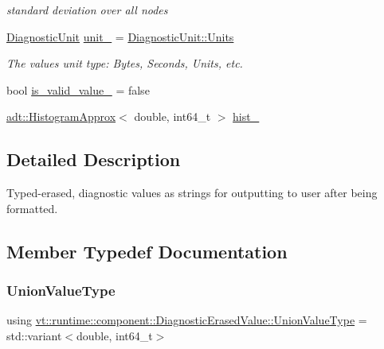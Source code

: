 \begin{DoxyCompactItemize}
\begin{DoxyCompactList}\small\item\em standard deviation over all nodes \end{DoxyCompactList}\item 
\hyperlink{namespacevt_1_1runtime_1_1component_a99ec18b08862c712176126bb7d0e307a}{Diagnostic\+Unit} \hyperlink{structvt_1_1runtime_1_1component_1_1_diagnostic_erased_value_aa43354cc162d6edaae48f878a6d874d1}{unit\+\_\+} = \hyperlink{namespacevt_1_1runtime_1_1component_a99ec18b08862c712176126bb7d0e307aae5771a362d88a71a657bfcd21ca54b3f}{Diagnostic\+Unit\+::\+Units}
\begin{DoxyCompactList}\small\item\em The value\textquotesingle{}s unit type\+: Bytes, Seconds, Units, etc. \end{DoxyCompactList}\item 
bool \hyperlink{structvt_1_1runtime_1_1component_1_1_diagnostic_erased_value_a1d9282d6e63f35b926953d6403865339}{is\+\_\+valid\+\_\+value\+\_\+} = false
\item 
\hyperlink{namespacevt_1_1adt_a486971e142bc22434d6afe695c43b599}{adt\+::\+Histogram\+Approx}$<$ double, int64\+\_\+t $>$ \hyperlink{structvt_1_1runtime_1_1component_1_1_diagnostic_erased_value_aae13ce0e05e55ba2d341d3fdcdda899c}{hist\+\_\+}
\end{DoxyCompactItemize}


\subsection{Detailed Description}
Typed-\/erased, diagnostic values as strings for outputting to user after being formatted. 

\subsection{Member Typedef Documentation}
\mbox{\label{structvt_1_1runtime_1_1component_1_1_diagnostic_erased_value_aadf18ed435e92e69769805f1335376c3}} 
\subsubsection{\texorpdfstring{Union\+Value\+Type}{UnionValueType}}
{\footnotesize\ttfamily using \hyperlink{structvt_1_1runtime_1_1component_1_1_diagnostic_erased_value_aadf18ed435e92e69769805f1335376c3}{vt\+::runtime\+::component\+::\+Diagnostic\+Erased\+Value\+::\+Union\+Value\+Type} =  std\+::variant$<$double, int64\+\_\+t$>$}

